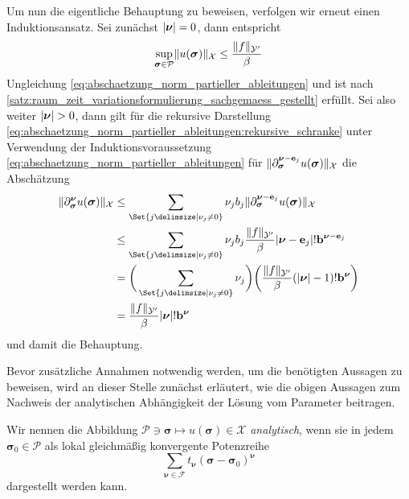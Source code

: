 \documentclass[../main.tex]{subfiles}
\begin{document}
\begin{Satz}
\begin{Beweis}
        Um nun die eigentliche Behauptung zu beweisen, verfolgen wir erneut einen Induktionsansatz.
        Sei zunächst $\lvert\bm\nu\rvert = 0$, dann entspricht
        \begin{equation}
            \sup_{\bm \sigma \in \mathcal P} \lVert u(\bm\sigma)\rVert_{\mathcal X} \leq \frac{\lVert f\rVert_{\mathcal Y'}}{\beta}
        \end{equation}
        Ungleichung \cref{eq:abschaetzung_norm_partieller_ableitungen} und ist nach \cref{satz:raum_zeit_variationsformulierung_sachgemaess_gestellt} erfüllt.
        Sei also weiter $\lvert\bm\nu\rvert > 0$, dann gilt für die rekursive Darstellung \cref{eq:abschaetzung_norm_partieller_ableitungen:rekursive_schranke} unter Verwendung der Induktionsvoraussetzung \cref{eq:abschaetzung_norm_partieller_ableitungen} für $\lVert\partial^{\bm\nu - \mathbf{e}_{j}}_{\bm\sigma} u(\bm\sigma)\rVert_{\mathcal X}$ die Abschätzung
        \begin{align}
            \norm{\partial^{\bm\nu}_{\bm\sigma} u(\bm\sigma)}_{\mathcal X}
            &\leq
            \sum_{\Set{j \given \nu_{j} \neq 0}} \nu_{j} b_{j} \norm{\partial^{\bm\nu - \vec e_{j}}_{\bm\sigma} u(\bm\sigma)}_{\mathcal X}
            \\&\leq
            \sum_{\Set{j \given \nu_{j} \neq 0}} \nu_{j} b_{j} \frac{\norm{f}_{\mathcal Y'}}{\beta} \abs{\bm\nu - \vec e_{j}}! \vec b^{\bm\nu - \vec e_{j}}
            \\&=
            \bigg( \sum_{\Set{j \given \nu_{j} \neq 0}} \nu_{j} \bigg) \bigg( \frac{\norm{f}_{\mathcal Y'}}{\beta} (\abs{\bm\nu} - 1)! \vec b^{\bm\nu} \bigg)
            \\&=
            \frac{\norm{f}_{\mathcal Y'}}{\beta} \abs{\bm\nu}! \vec b^{\bm\nu}
         \end{align}
         und damit die Behauptung.
    \end{Beweis}
\end{Satz}

Bevor zusätzliche Annahmen notwendig werden, um die benötigten Aussagen zu beweisen, wird an dieser Stelle zunächst erläutert, wie die obigen Aussagen zum Nachweis der analytischen Abhängigkeit der Lösung vom Parameter beitragen.

\begin{Definition}
\label{definition:analytisch}
    Wir nennen die Abbildung $\mathcal P \ni \bm \sigma \mapsto u(\bm \sigma) \in \mathcal X$ \emph{analytisch}, wenn sie in jedem $\bm\sigma_{0} \in \mathcal P$ als lokal gleichmäßig konvergente Potenzreihe
    \begin{equation}
        \sum_{\bm \nu \in \mathcal F} t_{\bm \nu} (\bm \sigma - \bm \sigma_{0})^{\bm \nu}
    \end{equation}
    dargestellt werden kann.
\end{Definition}
\end{document}
